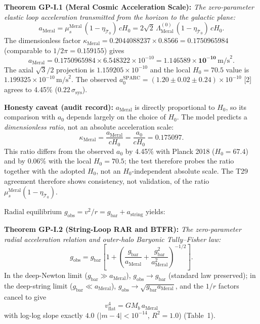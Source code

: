 \documentclass[12pt,a4paper]{article}
\begin{document}
\textbf{Theorem GP-I.1 (Meral Cosmic Acceleration Scale):} \textit{The
zero-parameter elastic loop acceleration transmitted from the horizon to the
galactic plane:}
\begin{equation}
\label{eq:ameral}
\boxed{a_{\mathrm{Meral}} = \mu_s^{\mathrm{Meral}}\,(1-\eta_{\mathcal{T}_0})\,cH_0
= 2\sqrt{2}\,\Lambda_{\mathrm{Meral}}^{(0)}\,(1-\eta_{\mathcal{T}_0})\,cH_0.}
\end{equation}
The dimensionless factor
$\kappa_{\mathrm{Meral}} = 0.2044088237\times 0.8566 = 0.1750965984$
(comparable to $1/2\pi = 0.159155$) gives
\begin{equation}
a_{\mathrm{Meral}} = 0.1750965984\times 6.548322\times 10^{-10}
= \mathbf{1.146589\times 10^{-10}}\,\mathrm{m/s}^2.
\end{equation}
The axial $\sqrt{3}/2$ projection is $1.159205\times 10^{-10}$ and the local
$H_0 = 70.5$ value is $1.199325\times 10^{-10}\,\mathrm{m/s}^2$.
The observed $a_0^{\mathrm{SPARC}} = (1.20\pm 0.02\pm 0.24)\times 10^{-10}$ [2]
agrees to 4.45\% ($0.22\,\sigma_{\mathrm{sys}}$).

\textbf{Honesty caveat (audit record):} $a_{\mathrm{Meral}}$ is directly
proportional to $H_0$, so its comparison with $a_0$ depends largely on the
choice of $H_0$. The model predicts a \emph{dimensionless ratio}, not an
absolute acceleration scale:
$$\kappa_{\mathrm{Meral}}=\frac{a_{\mathrm{Meral}}}{cH_0}
=\frac{a_0}{cH_0}=0.175097 .$$
This ratio differs from the observed $a_0$ by 4.45\% with Planck 2018
($H_0=67.4$) and by 0.06\% with the local $H_0=70.5$; the test therefore
probes the ratio together with the adopted $H_0$, not an $H_0$-independent
absolute scale. The T29 agreement therefore shows consistency, not
validation, of the ratio $\mu_s^{\mathrm{Meral}}(1-\eta_{\mathcal{T}_0})$.

Radial equilibrium $g_{\mathrm{obs}} = v^2/r = g_{\mathrm{bar}} + a_{\mathrm{string}}$
yields:

\textbf{Theorem GP-I.2 (String-Loop RAR and BTFR):} \textit{The zero-parameter
radial acceleration relation and outer-halo Baryonic Tully--Fisher law:}
\begin{equation}
\label{eq:rar}
\boxed{g_{\mathrm{obs}} = g_{\mathrm{bar}}\left[1+\left(
\frac{g_{\mathrm{bar}}}{a_{\mathrm{Meral}}}
+\frac{g_{\mathrm{bar}}^2}{a_{\mathrm{Meral}}^2}\right)^{-1/2}\right].}
\end{equation}
In the deep-Newton limit ($g_{\mathrm{bar}}\gg a_{\mathrm{Meral}}$),
$g_{\mathrm{obs}}\to g_{\mathrm{bar}}$ (standard law preserved); in the
deep-string limit ($g_{\mathrm{bar}}\ll a_{\mathrm{Meral}}$),
$g_{\mathrm{obs}}\to\sqrt{g_{\mathrm{bar}}a_{\mathrm{Meral}}}$, and the $1/r$
factors cancel to give
\begin{equation}
\boxed{v_{\mathrm{flat}}^4 = GM_b\,a_{\mathrm{Meral}}}
\end{equation}
with log-log slope exactly $4.0$ ($|m-4|<10^{-14}$, $R^2 = 1.0$) (Table~1).
\end{document}
